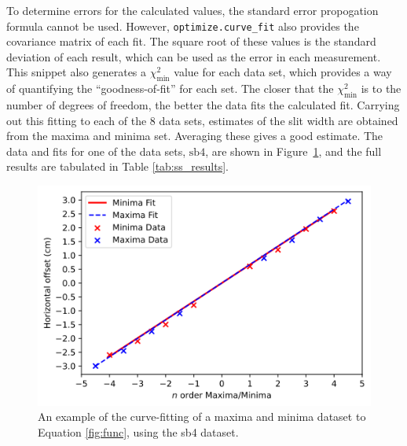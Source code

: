 \documentclass[a4paper]{article}
\begin{document}
To determine errors for the calculated values, the standard error propogation formula cannot be used. However, \lstinline$optimize.curve_fit$ also provides the covariance matrix of each fit. The square root of these values is the standard deviation of each result, which can be used as the error in each measurement. 
This snippet also generates a $\chi^2_\text{min}$ value for each data set, which provides a way of quantifying the ``goodness-of-fit'' for each set. The closer that the $\chi^2_\text{min}$ is to the number of degrees of freedom, the better the data fits the calculated fit. Carrying out this fitting to each of the 8 data sets, estimates of the slit width are obtained from the maxima and minima set. Averaging these gives a good estimate. The data and fits for one of the data sets, $\text{sb4}$, are shown in Figure~\ref{fig:ss_ex}, and the full results are tabulated in Table \ref{tab:ss_results}.
\begin{figure}[h]
  \centerline{\includegraphics[scale=0.8]{ss_ex.png}}
  \captionsetup{justification=centering}
  \caption{An example of the curve-fitting of a maxima and minima dataset to Equation \ref{fig:func}, using the sb4 dataset.}
  \label{fig:ss_ex}
\end{figure}
\end{document}
